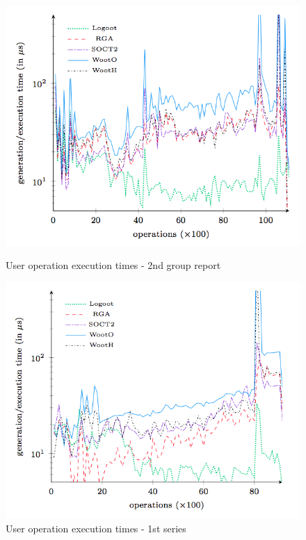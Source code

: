 \begin{figure}[h]

\begin{minipage}{0.50\linewidth}
  \includegraphics[width=1.2\textwidth]{includes/users_operations_2g_report.png}
  \caption{User operation execution times - 2nd group
report}
  \label{fig:users_operations_2g_report}
  \end{minipage} \hfill
  \begin{minipage}{.50\linewidth}
    \includegraphics[width=1.2\textwidth]{includes/users_operations_1t_big.png}
  	\caption{User operation execution times - 1st series}
  	\label{fig:users_operations_1t_big}
\end{minipage} \hfill
\end{figure}

